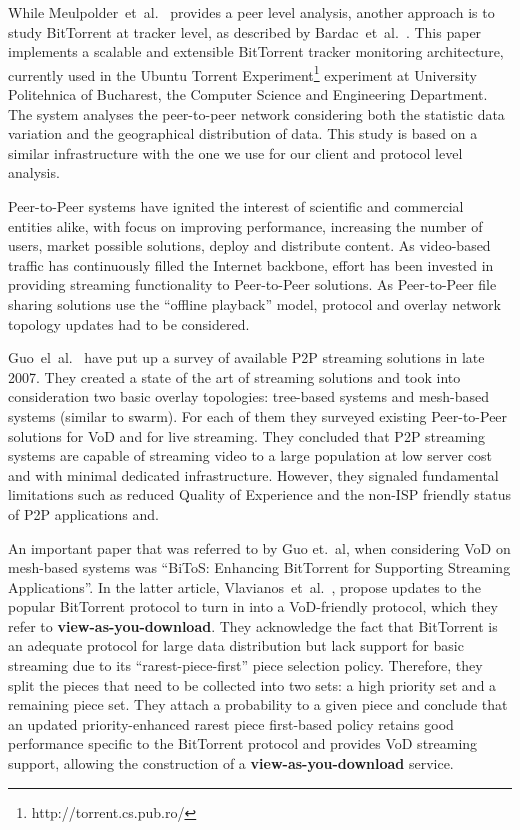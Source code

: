 While Meulpolder~et~al.~\cite{p2p09} provides a peer level analysis, another
approach is to study BitTorrent at tracker level, as described by
Bardac~et~al.~\cite{tracker-mon}.  This paper implements a scalable and
extensible BitTorrent tracker monitoring architecture, currently used in the
Ubuntu Torrent Experiment\footnote{http://torrent.cs.pub.ro/} experiment at
University Politehnica of Bucharest, the Computer Science and Engineering
Department. The system analyses the peer-to-peer network considering both the
statistic data variation and the geographical distribution of data. This study
is based on a similar infrastructure with the one we use for our client and
protocol level analysis.


Peer-to-Peer systems have ignited the interest of scientific and commercial
entities alike, with focus on improving performance, increasing the number of
users, market possible solutions, deploy and distribute content. As
video-based traffic has continuously filled the Internet backbone, effort has
been invested in providing streaming functionality to Peer-to-Peer solutions.
As Peer-to-Peer file sharing solutions use the ``offline playback'' model,
protocol and overlay network topology updates had to be considered.

Guo~el~al.~\cite{p2p-streaming-survey} have put up a survey of available P2P
streaming solutions in late 2007. They created a state of the art of streaming
solutions and took into consideration two basic overlay topologies: tree-based
systems and mesh-based systems (similar to swarm). For each of them they
surveyed existing Peer-to-Peer solutions for VoD and for live streaming. They
concluded that P2P streaming systems are capable of streaming video to a large
population at low server cost and with minimal dedicated infrastructure.
However, they signaled fundamental limitations such as reduced Quality of
Experience and the non-ISP friendly status of P2P applications and.

An important paper that was referred to by Guo et.~al, when considering VoD on
mesh-based systems was ``BiToS: Enhancing BitTorrent for Supporting Streaming
Applications''. In the latter article, Vlavianos~et~al.~\cite{bitos}, propose
updates to the popular BitTorrent protocol to turn in into a VoD-friendly
protocol, which they refer to \textbf{view-as-you-download}. They acknowledge
the fact that BitTorrent is an adequate protocol for large data distribution
but lack support for basic streaming due to its ``rarest-piece-first'' piece
selection policy. Therefore, they split the pieces that need to be collected
into two sets: a high priority set and a remaining piece set. They attach a
probability to a given piece and conclude that an updated priority-enhanced
rarest piece first-based policy retains good performance specific to the
BitTorrent protocol and provides VoD streaming support, allowing the
construction of a \textbf{view-as-you-download} service.

